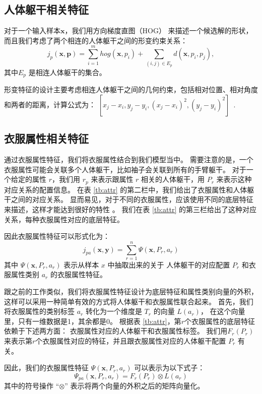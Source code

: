 \subsection{人体躯干相关特征}
对于一个输入样本$\mathbf{x}$，我们用方向梯度直图（HOG）\cite{hog} 来描述一个候选解的形状，
而且我们考虑了两个相连的人体躯干之间的形变约束关系：
\begin{equation}
    j_p(\mathbf{x}, \mathbf{p}) = \sum_{i=1}^m hog(\mathbf{x}, p_i) + \sum_{(i, j) \in E_p} d(\mathbf{x}, p_i, p_j),
\end{equation}
其中$E_p$ 是相连人体躯干的集合。

形变特征的设计主要考虑相连人体躯干之间的几何约束，包括相对位置、相对角度和两者的距离，计算公式为：
$[x_j - x_i, y_j - y_i, (x_j - x_i)^2, (y_j - y_i)^2]$~\cite{deva11}.

\subsection{衣服属性相关特征}
通过衣服属性特征，我们将衣服属性结合到我们模型当中。
需要注意的是，一个衣服属性可能会关联多个人体躯干，比如袖子会关联到所有的手臂躯干。
对于一个给定的属性 $r$，我们用 $r_p$ 来表示跟属性 $r$ 相关的人体躯干，用 $P_r$ 来表示这种对应关系的配置信息。
在表 \ref{tb:attr} 的第二栏中，我们给出了衣服属性和人体躯干之间的对应关系。
显而易见，对于不同的衣服属性，应该使用不同的底层特征来描述，这样才能达到很好的特性 \cite{clothliu}。
我们在表 \ref{tb:attr} 的第三栏给出了这种对应关系，每种衣服属性对应的底层特征。

因此衣服属性特征可以形式化为：
\begin{equation}
    \label{eq:j_pa}
    j_{pa}(\mathbf{x}, \mathbf{y}) = \sum_{r=1}^n \Psi(\mathbf{x}, P_r, a_r)
\end{equation}
其中 $\Psi(\mathbf{x}, P_r, a_r)$ 表示从样本 $x$ 中抽取出来的关于 人体躯干的对应配置 $P_r$ 和衣服属性类别 $a_r$ 的衣服属性特征。


跟之前的工作\cite{shen2014unified}类似，我们将衣服属性特征设计为底层特征和属性类别向量的外积，这样可以采用一种简单有效的方式将人体躯干和衣服属性联合起来。
首先，我们将衣服属性的类别标签 $a_r$ 转化为一个维度是 $T_r$ 的向量 $L(a_r)$，
在这个向量里，只有一维数据是1，其余都是0。
根据表 \ref{tb:attr}，第$r$个衣服属性的底层特征依赖于下述两方面：
衣服属性对应的人体躯干和衣服属性标签。
我们用$F_r(P_r)$来表示第$r$个衣服属性对应的特征，并且跟衣服属性对应的人体躯干配置 $P_r$ 有关。

因此，我们的衣服属性特征 $\Psi(\mathbf{x}, P_r, a_r)$ 可以表示为以下式子：
\begin{equation}
    \Psi_{pa}(\mathbf{x}, P_r, a_r) = F_r(P_r) \otimes L(a_r)
\end{equation}
其中的符号操作 ``$\otimes$'' 表示将两个向量的外积之后的矩阵向量化。

